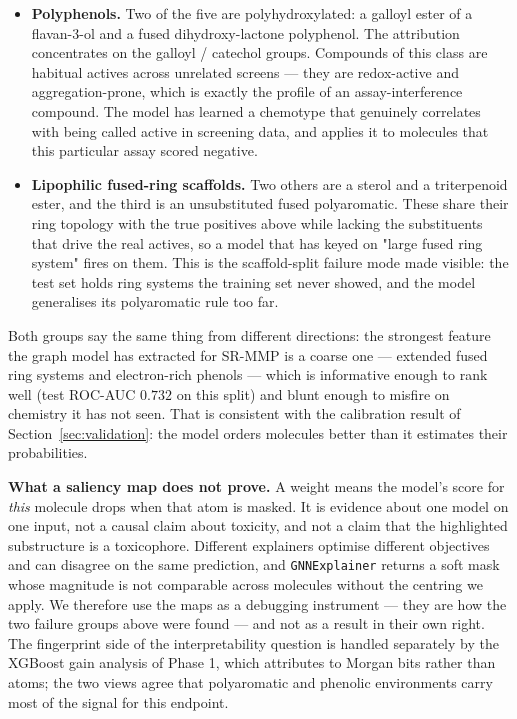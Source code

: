 \begin{itemize}
  \item \textbf{Polyphenols.} Two of the five are polyhydroxylated: a galloyl ester of a
        flavan-3-ol and a fused dihydroxy-lactone polyphenol. The attribution concentrates on the
        galloyl / catechol groups. Compounds of this class are habitual actives across unrelated
        screens --- they are redox-active and aggregation-prone, which is exactly the profile of
        an assay-interference compound. The model has learned a chemotype that genuinely
        correlates with being called active in screening data, and applies it to molecules that
        this particular assay scored negative.
  \item \textbf{Lipophilic fused-ring scaffolds.} Two others are a sterol and a triterpenoid
        ester, and the third is an unsubstituted fused polyaromatic. These share their ring
        topology with the true positives above while lacking the substituents that drive the real
        actives, so a model that has keyed on "large fused ring system" fires on them. This is
        the scaffold-split failure mode made visible: the test set holds ring systems the
        training set never showed, and the model generalises its polyaromatic rule too far.
\end{itemize}

Both groups say the same thing from different directions: the strongest feature the graph model
has extracted for SR-MMP is a coarse one --- extended fused ring systems and electron-rich
phenols --- which is informative enough to rank well (test ROC-AUC $0.732$ on this split) and
blunt enough to misfire on chemistry it has not seen. That is consistent with the calibration
result of Section~\ref{sec:validation}: the model orders molecules better than it estimates their
probabilities.

\textbf{What a saliency map does not prove.} A weight means the model's score for \emph{this}
molecule drops when that atom is masked. It is evidence about one model on one input, not a
causal claim about toxicity, and not a claim that the highlighted substructure is a toxicophore.
Different explainers optimise different objectives and can disagree on the same prediction, and
\texttt{GNNExplainer} returns a soft mask whose magnitude is not comparable across molecules
without the centring we apply. We therefore use the maps as a debugging instrument --- they are
how the two failure groups above were found --- and not as a result in their own right. The
fingerprint side of the interpretability question is handled separately by the XGBoost gain
analysis of Phase 1, which attributes to Morgan bits rather than atoms; the two views agree that
polyaromatic and phenolic environments carry most of the signal for this endpoint.

